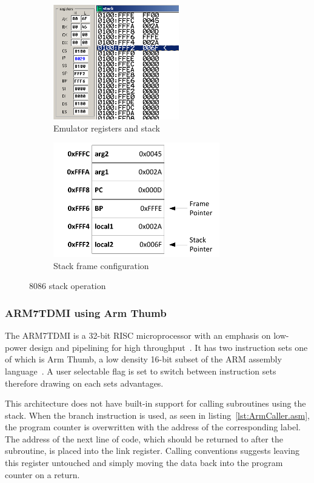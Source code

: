 \documentclass[12pt,a4paper]{article}
\begin{document}
\begin{figure}[htb]
        \centering
        \begin{subfigure}[b]{0.5\textwidth}
                \includegraphics[height=5cm]{Figures/emu.png}
                \caption{Emulator registers and stack}
                \label{fig:emu}
        \end{subfigure}%
        \begin{subfigure}[b]{0.5\textwidth}
                \includegraphics[height=5cm]{Figures/stack.pdf}
                \caption{Stack frame configuration}
                \label{fig:stack}
        \end{subfigure}
        \caption{8086 stack operation}
        \label{fig:8086}
\end{figure}







\subsubsection{ARM7TDMI using Arm Thumb}
The ARM7TDMI is a 32-bit RISC microprocessor with an emphasis on low-power design and pipelining for high throughput~\cite{ARM7TDMI}.
It has two instruction sets one of which is Arm Thumb, a low density 16-bit subset of the ARM assembly language~\cite{arm}.
A user selectable flag is set to switch between instruction sets therefore drawing on each sets advantages.

This architecture does not have built-in support for calling subroutines using the stack.
When the branch instruction is used, as seen in listing~\ref{lst:ArmCaller.asm}, the program counter is overwritten with the address of the corresponding label.
The address of the next line of code, which should be returned to after the subroutine, is placed into the link register.
Calling conventions suggests leaving this register untouched and simply moving the data back into the program counter on a return.

\end{document}
